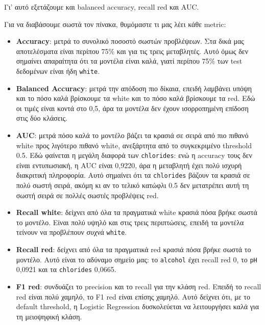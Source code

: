 \documentclass[11pt,a4paper]{article}
\newcommand{\code}[1]{\texttt{#1}}
\begin{document}
Γι' αυτό εξετάζουμε και balanced accuracy, recall red και AUC.

Για να διαβάσουμε σωστά τον πίνακα, θυμόμαστε τι μας λέει κάθε metric:
\begin{itemize}
    \item \textbf{Accuracy}: μετρά το συνολικό ποσοστό σωστών προβλέψεων.
    Στα δικά μας αποτελέσματα είναι περίπου 75\% και για τις τρεις
    μεταβλητές. Αυτό όμως δεν σημαίνει απαραίτητα ότι τα μοντέλα είναι καλά,
    γιατί περίπου 75\% των test δεδομένων είναι ήδη \code{white}.

    \item \textbf{Balanced Accuracy}: μετρά την απόδοση πιο δίκαια, επειδή
    λαμβάνει υπόψη και το πόσο καλά βρίσκουμε τα white και το πόσο καλά
    βρίσκουμε τα red. Εδώ οι τιμές είναι κοντά στο 0,5, άρα τα μοντέλα δεν
    έχουν ισορροπημένη επίδοση στις δύο κλάσεις.

    \item \textbf{AUC}: μετρά πόσο καλά το μοντέλο βάζει τα κρασιά σε σειρά
    από πιο πιθανό white προς λιγότερο πιθανό white, ανεξάρτητα από το
    συγκεκριμένο threshold 0.5. Εδώ φαίνεται η μεγάλη διαφορά των
    \code{chlorides}: ενώ η accuracy τους δεν είναι εντυπωσιακή, η AUC είναι
    0,9220, άρα η μεταβλητή έχει πολύ ισχυρή διακριτική πληροφορία. Αυτό
    σημαίνει ότι τα \code{chlorides} βάζουν τα κρασιά σε πολύ σωστή σειρά,
    ακόμη κι αν το τελικό κατώφλι 0.5 δεν μετατρέπει αυτή τη σωστή σειρά σε
    πολλές σωστές προβλέψεις red.

    \item \textbf{Recall white}: δείχνει από όλα τα πραγματικά white κρασιά
    πόσα βρήκε σωστά το μοντέλο. Είναι πολύ υψηλό και στις τρεις περιπτώσεις,
    επειδή τα μοντέλα τείνουν να προβλέπουν συχνά \code{white}.

    \item \textbf{Recall red}: δείχνει από όλα τα πραγματικά red κρασιά πόσα
    βρήκε σωστά το μοντέλο. Αυτό είναι το αδύναμο σημείο μας: το
    \code{alcohol} έχει recall red 0, το \code{pH} 0,0921 και τα
    \code{chlorides} 0,0665.

    \item \textbf{F1 red}: συνδυάζει το precision και το recall για την
    κλάση red. Επειδή το recall red είναι πολύ χαμηλό, το F1 red είναι επίσης
    χαμηλό. Αυτό δείχνει ότι, με το default threshold, η Logistic Regression
    δυσκολεύεται να λειτουργήσει καλά για τη μειοψηφική κλάση.
\end{itemize}
\end{document}
